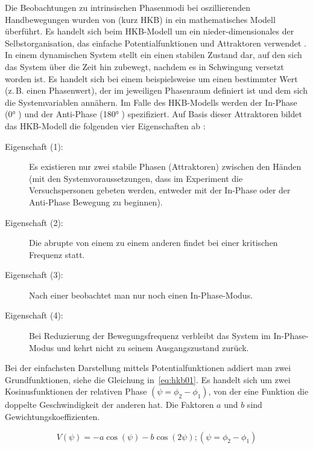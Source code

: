Die Beobachtungen zu intrinsischen Phasenmodi bei oszillierenden Handbewegungen wurden von \citet{Haken1985} (kurz HKB) in ein mathematisches Modell überführt. Es handelt sich beim HKB-Modell um ein nieder-dimensionales  der Selbstorganisation, das einfache Potentialfunktionen und Attraktoren verwendet \citep{Nam2009b}. In einem dynamischen System stellt ein  einen stabilen Zustand dar, auf den sich das System über die Zeit hin zubewegt, nachdem es in Schwingung versetzt worden ist. Es handelt sich bei einem  beispielsweise um einen bestimmter Wert (z.\,B. einen Phasenwert), der im jeweiligen Phasenraum definiert ist und dem sich die Systemvariablen annähern. Im Falle des HKB-Modells werden der In-Phase  (0° ) und der Anti-Phase  (180° ) spezifiziert. Auf Basis dieser Attraktoren bildet das HKB-Modell die folgenden vier Eigenschaften ab \citep[][348]{Haken1985}:

\begin{description}
	\item[Eigenschaft (1):] Es existieren nur zwei stabile Phasen (Attraktoren) zwischen den Händen (mit den Systemvoraussetzungen, dass im Experiment die Versuchspersonen gebeten werden, entweder mit der In-Phase oder der Anti-Phase Bewegung zu beginnen).
	\item[Eigenschaft (2):] Die abrupte  von einem  zu einem anderen findet bei einer kritischen Frequenz statt.
	\item[Eigenschaft (3):] Nach einer  beobachtet man nur noch einen In-Phase-Modus.
	\item[Eigenschaft (4):] Bei Reduzierung der Bewegungsfrequenz verbleibt das System im In-Phase-Modus und kehrt nicht zu seinem Ausgangszustand zurück.
\end{description}

Bei der einfachsten Darstellung mittels Potentialfunktionen addiert man zwei Grundfunktionen, siehe die Gleichung in~\ref{eq:hkb01}. Es handelt sich um zwei Kosinusfunktionen der relativen Phase $\left(\psi =\phi_2-\phi_1\right)$, von der eine Funktion die doppelte Geschwindigkeit der anderen hat. Die Faktoren $a$ und  $b$ sind Gewichtungskoeffizienten. 

\begin{equation}
\label{eq:hkb01}
V(\psi)=-a\cos(\psi)-b\cos(2\psi);(\psi ={\phi} _{2}-{\phi} _{1})
\end{equation}

